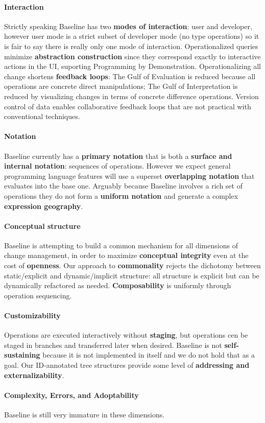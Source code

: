 \documentclass[english,submission]{programming}
\theoremstyle{definition}
\newcommand{\myparagraph}[1]{\vspace{-8pt}\paragraph{#1}}
\begin{document}
\myparagraph{Interaction} Strictly speaking Baseline has two \textbf{modes of interaction}: user and developer, however user mode is a strict subset of developer mode (no type operations) so it is fair to say there is really only one mode of interaction.
Operationalized queries minimize \textbf{abstraction construction} since they correspond exactly to interactive actions in the UI, suporting Programming by Demonstration.
Operationalizing all change shortens \textbf{feedback loops}: The Gulf of Evaluation is reduced because all operations are concrete direct manipulations; The Gulf of Interpretation is reduced by visualizing changes in terms of concrete difference operations. Version control of data enables collaborative feedback loops that are not practical with conventional techniques.

\myparagraph{Notation} Baseline currently has a \textbf{primary notation} that is both a \textbf{surface and internal notation}: sequences of operations. However we expect general programming language features will use a superset \textbf{overlapping notation} that evaluates into the base one. Arguably because Baseline involves a rich set of operations they do not form a \textbf{uniform notation} and generate a complex \textbf{expression geography}.

\myparagraph{Conceptual structure} Baseline is attempting to build a common mechanism for all dimensions of change management, in order to maximize \textbf{conceptual integrity} even at the cost of \textbf{openness}. Our approach to \textbf{commonality} rejects the  dichotomy between static/explicit and dynamic/implicit structure: all structure is explicit but can be dynamically refactored as needed. \textbf{Composability} is uniformly through operation sequencing.

\myparagraph{Customizability} Operations are executed interactively without \textbf{staging}, but operations cen be staged in branches and transferred later when desired. Baseline is not \textbf{self-sustaining} because it is not implemented in itself and we do not hold that as a goal. Our ID-annotated tree structures provide some level of \textbf{addressing and externalizability}.

\myparagraph{Complexity, Errors, and Adoptability} Baseline is still very immature in these dimensions.





\printbibliography
\end{document}
